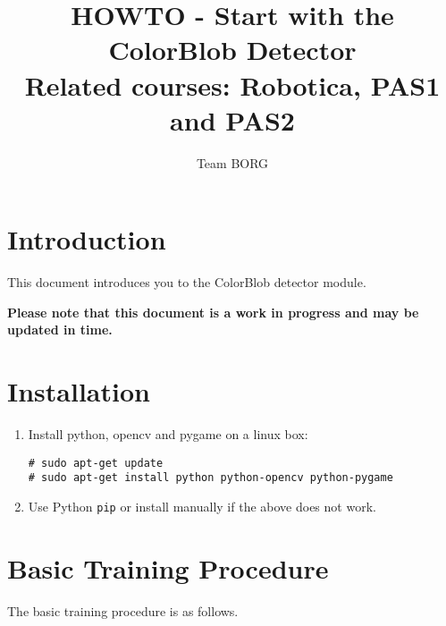 \documentclass[a4paper, 10pt]{article}
\title{HOWTO - Start with the ColorBlob Detector \\ \small{Related courses: Robotica, PAS1 and PAS2}}
\author{Team BORG}
\begin{document}
\maketitle

\tableofcontents

\section{Introduction}

This document introduces you to the ColorBlob detector module.

\textbf{Please note that this document is a work in progress and may be updated in time.}

\section{Installation}

\begin{enumerate}
    \item Install python, opencv and pygame on a linux box:
\begin{lstlisting}
# sudo apt-get update
# sudo apt-get install python python-opencv python-pygame
\end{lstlisting}
    \item Use Python \lstinline{pip} or install manually if the above does not work.
\end{enumerate}

\section{Basic Training Procedure}

The basic training procedure is as follows.
\end{document}
